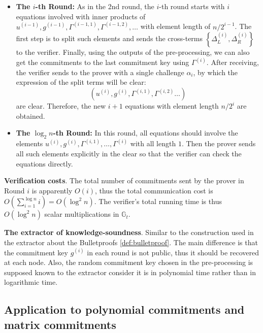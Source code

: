 \documentclass{article}
\begin{document}
\begin{itemize}
\item \textbf{The $i$-th Round: } As in the 2nd round, the $i$-th round starts with $i$ equations involved with inner products of $u^{(i-1)}, g^{(i-1)}, \Gamma^{(i-1, 1)}, \Gamma^{(i-1, 2)}, \dots$ with element length of $n/2^{i-1}$. The first step is to split such elements and sends the cross-terms $\left\{ \Delta^{(i)}_L, \Delta^{(i)}_{R} \right\}$ to the verifier. Finally, using the outputs of the pre-processing, we can also get the commitments to the last commitment key using $\Gamma^{(i)}$. After receiving, the verifier sends to the prover with a single challenge $\alpha_i$, by which the expression of the split terms will be clear:
\begin{equation*}
\left( u^{(i)}, g^{(i)}, \Gamma^{(i, 1)}, \Gamma^{(i, 2)} \dots \right)
\end{equation*}
are clear. Therefore, the new $ i + 1$ equations with element length $n/2^i$ are obtained. 
\item \textbf{The $\log_2 n$-th Round: } In this round, all equations should involve the elements $u^{(i)}, g^{(i)}, \Gamma^{(i, 1)}, \dots, \Gamma^{(i)}$ with all length $1$. Then the prover sends all such elements explicitly in the clear so that the verifier can check the equations directly. 
\end{itemize} 

\textbf{Verification costs}. The total number of commitments sent by the prover in Round $i$ is apparently $O(i)$, thus the total communication cost is $O(\sum_{i = 1}^{\log n} i) = O(\log^2 n)$. The verifier's total running time is thus $O(\log^2 n)$ scalar multiplications in $\mathbb{G}_t$.

\textbf{The extractor of knowledge-soundness}. Similar to the construction used in the extractor about the Bulletproofs \ref{def:bulletproof}. The main difference is that the commitment key $g^{(i)}$ in each round is not public, thus it should be recovered at each node. Also, the random commitment key chosen in the pre-processing is supposed known to the extractor consider it is in polynomial time rather than in logarithmic time. 

\subsection{Application to polynomial commitments and  matrix commitments}
\end{document}
